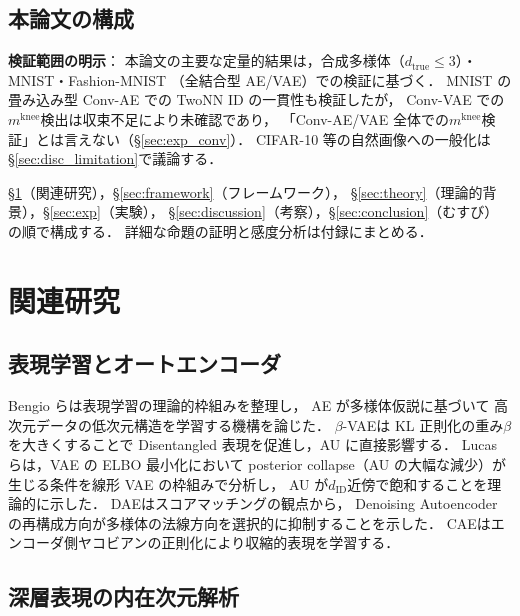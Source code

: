 \documentclass[11pt,a4paper]{jsarticle}
\newcommand{\mknee}{m^{\mathrm{knee}}}
\begin{document}
\subsection{本論文の構成}\label{sec:intro_structure}

\textbf{検証範囲の明示}：
本論文の主要な定量的結果は，合成多様体（$d_{\mathrm{true}} \leq 3$）・MNIST・Fashion-MNIST
（全結合型 AE/VAE）での検証に基づく．
MNIST の畳み込み型 Conv-AE での TwoNN ID の一貫性も検証したが，
Conv-VAE での$\mknee$検出は収束不足により未確認であり，
「Conv-AE/VAE 全体での$\mknee$検証」とは言えない（§\ref{sec:exp_conv}）．
CIFAR-10 等の自然画像への一般化は§\ref{sec:disc_limitation}で議論する．

§\ref{sec:related}（関連研究），§\ref{sec:framework}（フレームワーク），
§\ref{sec:theory}（理論的背景），§\ref{sec:exp}（実験），
§\ref{sec:discussion}（考察），§\ref{sec:conclusion}（むすび）の順で構成する．
詳細な命題の証明と感度分析は付録にまとめる．

\section{関連研究}\label{sec:related}

\subsection{表現学習とオートエンコーダ}\label{sec:related_ae}

Bengio ら\cite{bengio2013representation}は表現学習の理論的枠組みを整理し，
AE が多様体仮説\cite{fefferman2016manifold}に基づいて
高次元データの低次元構造を学習する機構を論じた．
$\beta$-VAE\cite{higgins2017betavae}は KL 正則化の重み$\beta$を大きくすることで
Disentangled 表現を促進し，AU に直接影響する．
Lucas ら\cite{lucas2019elbo}は，VAE の ELBO 最小化において
posterior collapse（AU の大幅な減少）が生じる条件を線形 VAE の枠組みで分析し，
AU が$d_{\mathrm{ID}}$近傍で飽和することを理論的に示した．
DAE\cite{alain2014dae}はスコアマッチングの観点から，
Denoising Autoencoder の再構成方向が多様体の法線方向を選択的に抑制することを示した．
CAE\cite{rifai2011cae}はエンコーダ側ヤコビアンの正則化により収縮的表現を学習する．

\subsection{深層表現の内在次元解析}\label{sec:related_id}
\end{document}
